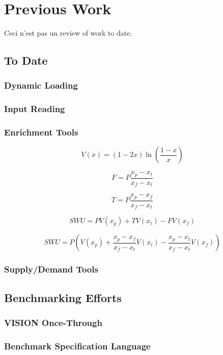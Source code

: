 \chapter{Previous Work}\label{ch:prevwork}

Ceci n'est pas un review of work to date. 

\section{\Cyclus To Date}

\subsection{Dynamic Loading}\label{sec:prev-dynamic}

\subsection{Input Reading}

\subsection{Enrichment Tools}\label{sec:prev-enrich}


\begin{equation}\label{eqs:enr-value}
  V(x) = (1 - 2x) \ln \left( \frac{1-x}{x} \right)
\end{equation}

\begin{equation}\label{eqs:enr-feed}
  F = P \frac{x_{p} - x_{t}}{x_{f} - x_{t}}
\end{equation}

\begin{equation}\label{eqs:enr-tails}
  T = P \frac{x_{p} - x_{f}}{x_{f} - x_{t}}
\end{equation}

\begin{equation}\label{eqs:enr-swu}
  SWU = P V(x_{p}) + T V(x_{t}) - F V(x_{f})
\end{equation}

\begin{equation}\label{eqs:enr-swu-p}
  SWU = P \left( V(x_{p}) + \frac{x_{p} - x_{f}}{x_{f} - x_{t}} V(x_{t}) 
        - \frac{x_{p} - x_{t}}{x_{f} - x_{t}} V(x_{f}) \right)
\end{equation}

\subsection{Supply/Demand Tools}

\subsection{\Cyclopts}

\section{Benchmarking Efforts}\label{sec:prev-benchmark}

\subsection{VISION Once-Through}

\subsection{Benchmark Specification Language}
